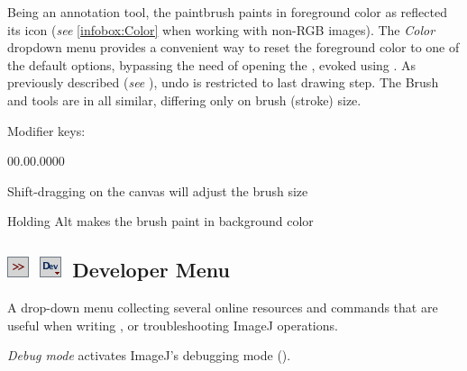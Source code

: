 Being an annotation tool, the paintbrush paints
in foreground color as reflected its icon (\emph{see} \ref{infobox:Color}
 when working with non-RGB images). The \emph{Color}
dropdown menu provides a convenient way to reset the foreground color
to one of the default options, bypassing the need of opening the ,
evoked using  .\emph{ }As previously
described (\emph{see} ), undo is restricted
to last drawing step. The Brush and  tools are
in all similar, differing only on brush (stroke) size.

Modifier keys:
\begin{lyxlist}{00.00.0000}
\item [{\mykeystroke{Shift}}] \noindent Shift-dragging on the canvas will
adjust the brush size
\item [{\mykeystroke{Alt}}] \noindent Holding Alt makes the brush paint
in background color 
\end{lyxlist}



\subsection[Developer Menu]{\noindent \textsf{\protect\includegraphics[bb=0bp 5bp 20bp 20bp,scale=0.6]{images/tools/Switcher}}~\textsf{\protect\includegraphics[bb=0bp 5bp 20bp 20bp,scale=0.6]{images/tools/DevMenu}}~Developer
Menu\label{sub:DevMenu}\feature{}}

A drop-down menu collecting several online resources and commands
that are useful when writing , 
or troubleshooting ImageJ operations.

\emph{Debug mode} activates ImageJ's debugging mode ().




